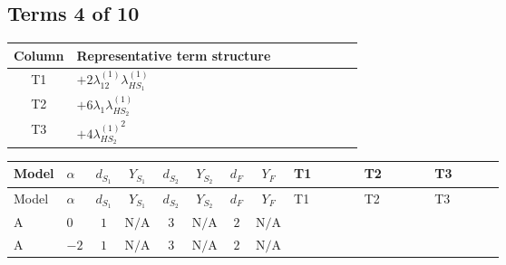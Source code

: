 \documentclass[8pt]{article}
\begin{document}
\begin{landscape}
\subsection*{Terms 4 of 10}
\begin{center}
\begin{tabular}{@{}c >{\raggedright\arraybackslash}p{0.82\linewidth}@{}}
\toprule
Column & Representative term structure \\
\midrule
T1 & \(\displaystyle +2 {\lambda_{12}^{(1)}} {\lambda_{HS_1}^{(1)}}\) \\
\midrule
T2 & \(\displaystyle +6 {\lambda_1} {\lambda_{HS_2}^{(1)}}\) \\
\midrule
T3 & \(\displaystyle +4 {\lambda_{HS_2}^{(1)}}^2\) \\
\midrule
\bottomrule
\end{tabular}
\end{center}
\smallskip
\tiny
\begin{longtable}{@{}llcccccc >{\raggedright\arraybackslash}p{0.21\linewidth} >{\raggedright\arraybackslash}p{0.21\linewidth} >{\raggedright\arraybackslash}p{0.21\linewidth}@{}}
\toprule
Model & $\alpha$ & $d_{S_1}$ & $Y_{S_1}$ & $d_{S_2}$ & $Y_{S_2}$ & $d_F$ & $Y_F$ & T1 & T2 & T3 \\
\midrule
\endfirsthead
\toprule
Model & $\alpha$ & $d_{S_1}$ & $Y_{S_1}$ & $d_{S_2}$ & $Y_{S_2}$ & $d_F$ & $Y_F$ & T1 & T2 & T3 \\
\midrule
\endhead
A & $0$ & $1$ & $\text{N/A}$ & $3$ & $\text{N/A}$ & $2$ & $\text{N/A}$ & \scriptsize\adjustbox{max width=\linewidth}{$\begin{gathered} +2 {\lambda_{12}^{(1)}} {\lambda_{HS_1}^{(1)}}\end{gathered}$} & \scriptsize\adjustbox{max width=\linewidth}{$\begin{gathered} +6 {\lambda_1} {\lambda_{HS_2}^{(1)}}\end{gathered}$} & \scriptsize\adjustbox{max width=\linewidth}{$\begin{gathered} +4 {\lambda_{HS_2}^{(1)}}^2\end{gathered}$} \\
\midrule
A & $-2$ & $1$ & $\text{N/A}$ & $3$ & $\text{N/A}$ & $2$ & $\text{N/A}$ & \scriptsize\adjustbox{max width=\linewidth}{$\begin{gathered} +2 {\lambda_{12}^{(1)}} {\lambda_{HS_1}^{(1)}}\end{gathered}$} & \scriptsize\adjustbox{max width=\linewidth}{$\begin{gathered} +6 {\lambda_1} {\lambda_{HS_2}^{(1)}}\end{gathered}$} & \scriptsize\adjustbox{max width=\linewidth}{$\begin{gathered} +4 {\lambda_{HS_2}^{(1)}}^2\end{gathered}$} \\

\end{longtable}
\end{landscape}
\end{document}
